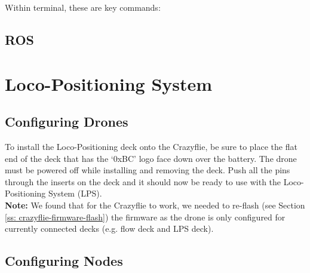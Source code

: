 \documentclass[]{article}
\begin{document}
Within terminal, these are key commands:

\subsection{ROS}

\section{Loco-Positioning System}

\subsection{Configuring Drones}

\noindent To install the Loco-Positioning deck onto the Crazyflie, be sure to place the flat end of the deck that has the `0xBC' logo face down over the battery. The drone must be powered off while installing and removing the deck. Push all the pins through the inserts on the deck and it should now be ready to use with the Loco-Positioning System (LPS). \\

{\bfseries Note:} We found that for the Crazyflie to work, we needed to re-flash (see Section \ref{ss: crazyflie-firmware-flash}) the firmware as the drone is only configured for currently connected decks (e.g. flow deck and LPS deck). \\

\subsection{Configuring Nodes}
\end{document}
